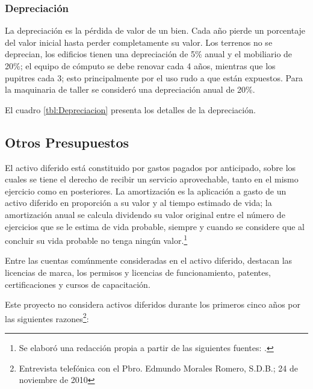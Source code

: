 \subsubsection{Depreciación}

La depreciación es la pérdida de valor de un bien. Cada año pierde un porcentaje del valor inicial hasta perder completamente su valor. Los terrenos no se deprecian, los edificios tienen una depreciación de 5\% anual y el mobiliario de 20\%; el equipo de cómputo se debe renovar cada 4 años, mientras que los pupitres cada 3; esto principalmente por el uso rudo a que están expuestos. Para la maquinaria de taller se consideró una depreciación anual de 20\%.

El cuadro \ref{tbl:Depreciacion} presenta los detalles de la depreciación.



\subsection{Otros Presupuestos}
\label{sub:Otros:Presupuestos}


El activo diferido está constituido por gastos pagados por anticipado, sobre los cuales se tiene el derecho de recibir un servicio aprovechable, tanto en el mismo ejercicio como en posteriores. La amortización es la aplicación a gasto de un activo diferido en proporción a su valor y al tiempo estimado de vida; la amortización anual se calcula dividendo su valor original entre el número de ejercicios que se le estima de vida probable, siempre y cuando se considere que al concluir su vida probable no tenga ningún valor.\footnote{Se elaboró una redacción propia a partir de las siguientes fuentes: \citep{brock1987contabilidad, mejia2006diccionario, dobarganes2005contabilidad}.}


Entre las cuentas comúnmente consideradas en el activo diferido, destacan las licencias de marca, los permisos y licencias de funcionamiento, patentes, certificaciones y cursos de capacitación.

Este proyecto no considera activos diferidos durante los primeros cinco años por las siguientes razones\footnote{Entrevista telefónica con el Pbro. Edmundo Morales Romero, S.D.B.; 24 de noviembre de 2010}:


